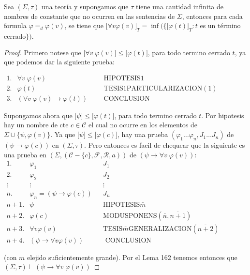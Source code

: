   \begin{lemma} \label{lemma_79}
    \PN Sea $(\Sigma, \tau)$ una teoría y supongamos que $\tau$ tiene una cantidad infinita de nombres de constante que
    no ocurren en las sentencias de $\Sigma$, entonces para cada formula $\varphi =_{d} \varphi(v)$, se tiene que
    $\lbrack \forall v\varphi (v) \rbrack_{T} = \inf(\{\lbrack \varphi(t) \rbrack_{T}: t$ es un término cerrado$\})$.
  \end{lemma}
  \begin{proof}
    Primero notese que $\lbrack\forall v\;\varphi (v)\rbrack\leq \lbrack \varphi (t)\rbrack$, para todo termino cerrado $t$, ya que podemos dar la siguiente prueba:

    $\displaystyle \begin{array}{cllll} 1. & \forall v\;\varphi (v) & & & \text{HIPOTESIS}1 \\ 2. & \varphi (t) & & & \text{TESIS}1\text{PARTICULARIZACION}(1) \\ 3. & (\forall v\;\varphi (v)\rightarrow \varphi (t)) & & & \text{CONCLUSION } \end{array} $

    Supongamos ahora que $\lbrack\psi \rbrack\leq \lbrack \varphi (t)\rbrack$, para todo termino cerrado $t.$ Por hipotesis hay un nombre de cte $c\in \mathcal{C}$ el cual no ocurre en los elementos de $\Sigma \cup \{\psi ,\varphi (v)\}.$ Ya que $ \lbrack\psi \rbrack\leq \lbrack \varphi (c)\rbrack$, hay una prueba $(\varphi_{1}\dotsc\varphi_{n},J_{1}\dotsc J_{n})$ de $\left( \psi \rightarrow \varphi (c)\right) $ en $(\Sigma, \tau)$. Pero entonces es facil de chequear que la siguiente es una prueba en $(\Sigma ,(\mathcal{C}-\{c\},\mathcal{F},\mathcal{R},a))$ de $ \left( \psi \rightarrow \forall v\;\varphi (v)\right) $:
    $\displaystyle \begin{array}{rlcl} 1. & \varphi_{1} & & J_{1} \\ 2. & \varphi_{2} & & J_{2} \\ \vdots & \vdots & & \vdots \\ n. & \varphi_{n}=\left( \psi \rightarrow \varphi (c)\right) & & J_{n} \\ n+1. & \psi & & \text{HIPOTESIS}\bar{m} \\ n+2. & \varphi (c) & & \text{MODUSPONENS}(\bar{n},\overline{n+1}) \\ n+3. & \forall v\varphi (v) & & \text{TESIS}\bar{m}\text{GENERALIZACION}( \overline{n+2}) \\ n+4. & \left( \psi \rightarrow \forall v\varphi (v)\right) & & \text{ CONCLUSION} \end{array} $

    (con $m$ elejido suficientemente grande). Por el Lema 162 tenemos entonces que $(\Sigma, \tau)\vdash \left( \psi \rightarrow \forall v\;\varphi (v)\right) $
  \end{proof}

